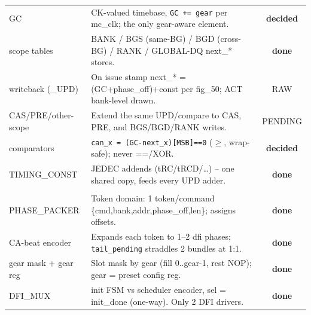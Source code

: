 \documentclass[10pt]{article}
\newcommand{\st}[1]{\textbf{\textcolor{done}{#1}}}
\begin{document}
{\begin{longtable}{B P S}
\\
\midrule
GC                 & CK-valued timebase, \texttt{GC += gear} per mc\_clk; the only gear-aware element. & \st{decided}\\
scope tables       & BANK / BGS (same-BG) / BGD (cross-BG) / RANK / GLOBAL-DQ next\_* stores. & \st{done}\\
writeback (\*\_UPD) & On issue stamp next\_* = (GC+phase\_off)+const per fig\_50; ACT bank-level drawn. & RAW\\
\quad CAS/PRE/other-scope & Extend the same UPD/compare to CAS, PRE, and BGS/BGD/RANK writes. & PENDING\\
comparators        & \texttt{can\_x = (GC-next\_x)[MSB]==0} ($\geq$, wrap-safe); never ==/XOR. & \st{decided}\\
TIMING\_CONST      & JEDEC addends (tRC/tRCD/\dots) -- one shared copy, feeds every UPD adder. & \st{done}\\
\midrule

\\
\midrule
PHASE\_PACKER      & Token domain: 1 token/command \{cmd,bank,addr,phase\_off,len\}; assigns offsets. & \st{done}\\
CA-beat encoder    & Expands each token to 1--2 dfi phases; \texttt{tail\_pending} straddles 2 bundles at 1:1. & \st{done}\\
gear mask + gear reg & Slot mask by gear (fill 0..gear-1, rest NOP); gear = preset config reg. & \st{done}\\
DFI\_MUX           & init FSM vs scheduler encoder, sel = init\_done (one-way). Only 2 DFI drivers. & \st{done}\\
\midrule


\end{longtable}}
\end{document}
